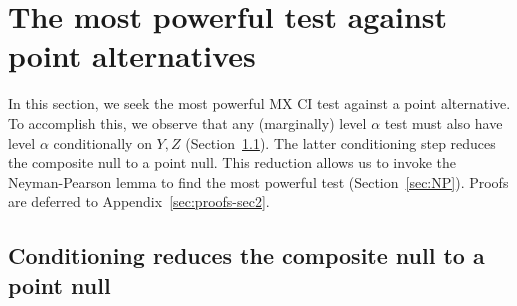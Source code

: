 \documentclass[12pt]{article}
\theoremstyle{definition}
\theoremstyle{remark}
\newcommand{\srx}{X}
\newcommand{\srz}{Z}
\newcommand{\srxk}{\widetilde X}
\newcommand{\sry}{Y}
\begin{document}
%



\section{The most powerful test against point alternatives} \label{sec:power}

In this section, we seek the most powerful MX CI test against a point alternative. To accomplish this, we observe that any (marginally) level $\alpha$ test must also have level $\alpha$ conditionally on $\sry, \srz$ (Section~\ref{sec:reduction-by-conditioning}). The latter conditioning step reduces the composite null to a point null. This reduction allows us to invoke the Neyman-Pearson lemma to find the most powerful test  (Section~\ref{sec:NP}). Proofs are deferred to Appendix~\ref{sec:proofs-sec2}.

\subsection{Conditioning reduces the composite null to a point null} \label{sec:reduction-by-conditioning}
\end{document}
